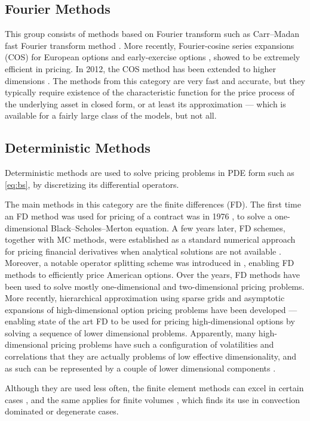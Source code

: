\documentclass{UUThesisTemplate}
\begin{document}
\subsection{Fourier Methods}
\par This group consists of methods based on Fourier transform such as Carr--Madan fast Fourier transform method \cite{carr1999option}. More recently, Fourier-cosine series expansions (COS) for European options \cite{fang2008novel} and early-exercise options \cite{fang2009pricing}, showed to be extremely efficient in pricing. In 2012, the COS method has been extended to higher dimensions \cite{ruijter2012two}. The methods from this category are very fast and accurate, but they typically require existence of the characteristic function for the price process of the underlying asset in closed form, or at least its approximation --- which is available for a fairly large class of the models, but not all. 
%
\subsection{Deterministic Methods}
\par Deterministic methods are used to solve pricing problems in PDE form such as \eqref{eq:bs}, by discretizing its differential operators. 
\par The main methods in this category are the finite differences (FD). The first time an FD method was used for pricing of a contract was in 1976 \cite{brennan1976pricing}, to solve a one-dimensional Black--Scholes--Merton equation. A few years later, FD schemes, together with MC methods, were established as a standard numerical approach for pricing financial derivatives when analytical solutions are not available \cite{brennan1978finite}. Moreover, a notable operator splitting scheme was introduced in \cite{ikonen2004operator}, enabling FD methods to efficiently price American options. Over the years, FD methods have been used to solve mostly one-dimensional and two-dimensional pricing problems. More recently, hierarchical approximation using sparse grids \cite{reisinger2007efficient} and asymptotic expansions \cite{reisinger2015numerical} of high-dimensional option pricing problems have been developed --- enabling state of the art FD \cite{foulon2010adi, haentjens2012adi} to be used for pricing high-dimensional options by solving a sequence of lower dimensional problems. Apparently, many high-dimensional pricing problems have such a configuration of volatilities and correlations that they are actually problems of low effective dimensionality, and as such can be represented by a couple of lower dimensional components \cite{wang2005high}.
\par Although they are used less often, the finite element methods can excel in certain cases \cite{zvan1998general, forsyth1999finite, heinecke2012highly}, and the same applies for finite volumes \cite{zvan2001finite}, which finds its use in convection dominated or degenerate cases.
%
\end{document}
